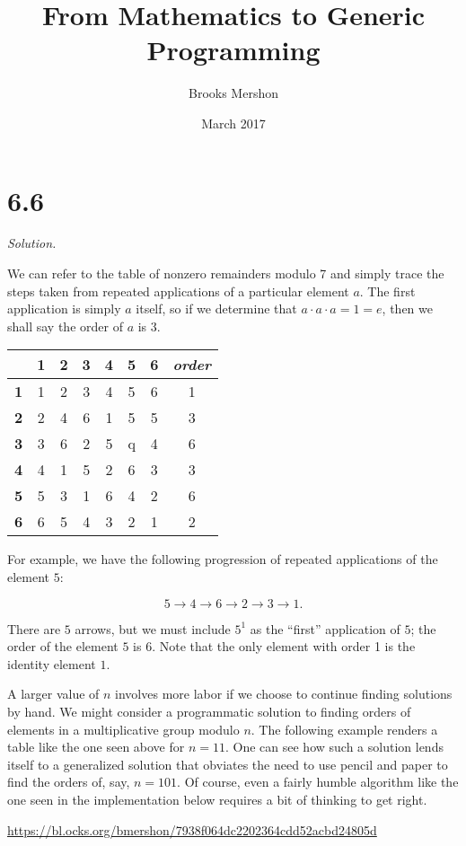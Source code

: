 \documentclass{article}
\title{From Mathematics to Generic Programming}
\author{Brooks Mershon}
\date{March 2017}
\begin{document}
\maketitle

\section*{6.6}

\textit{Solution.}

We can refer to the table of nonzero remainders modulo 7 and simply trace the steps taken from repeated applications of a particular element $a$. The first application is simply $a$ itself, so if we determine that $a \cdot a \cdot a = 1 = e$, then we shall say the order of $a$ is $3$.

\begin{center}
\begin{tabular}{ c|c|c|c|c|c|c|c} 
 & \textbf{1} & \textbf{2} & \textbf{3} & \textbf{4} & \textbf{5} & \textbf{6} & \textit{order} \\
 \hline
 \textbf{1} & 1 & 2 & 3 & 4 & 5 & 6 & 1 \\ 
 \hline
 \textbf{2} & 2 & 4 & 6 & 1 & 5 & 5 & 3 \\ 
 \hline
 \textbf{3} & 3 & 6 & 2 & 5 & q & 4 & 6\\ 
 \hline
 \textbf{4} & 4 & 1 & 5 & 2 & 6 & 3 & 3\\ 
 \hline
 \textbf{5} & 5 & 3 & 1 & 6 & 4 & 2 & 6\\
 \hline
 \textbf{6} & 6 & 5 & 4 & 3 & 2 & 1 & 2\\
 \hline
\end{tabular}
\end{center}

For example, we have the following progression of repeated applications of the element $5$:

$$5 \rightarrow 4 \rightarrow 6 \rightarrow 2 \rightarrow 3 \rightarrow 1.$$

There are $5$ arrows, but we must include $5^1$ as the ``first'' application of $5$; the order of the element $5$ is $6$. Note that the only element with order 1 is the identity element $1$.

A larger value of $n$ involves more labor if we choose to continue finding solutions by hand. We might consider a programmatic solution to finding orders of elements in a multiplicative group modulo $n$. The following example renders a table like the one seen above for $n = 11$. One can see how such a solution lends itself to a generalized solution that obviates the need to use pencil and paper to find the orders of, say, $n = 101$. Of course, even a fairly humble algorithm like the one seen in the implementation below requires a bit of thinking to get right.

\bigskip

\url{https://bl.ocks.org/bmershon/7938f064dc2202364cdd52acbd24805d}
\end{document}
